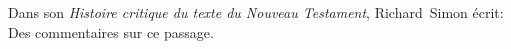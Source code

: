 \documentclass[a4]{article}
\begin{document}
Dans son \emph{Histoire critique du texte du Nouveau Testament}, Richard~Simon écrit:
Des commentaires sur ce passage.
\end{document}
